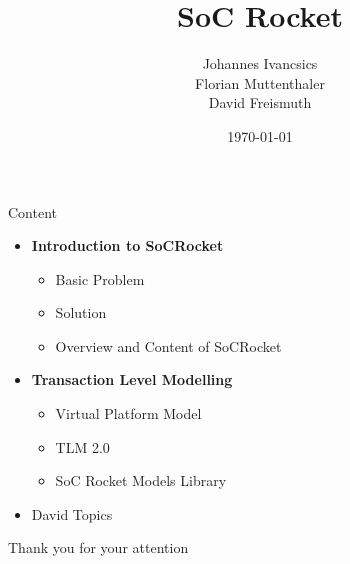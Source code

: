 \documentclass{beamer}
\title[SoC Rocket]{SoC Rocket}
\author{Johannes Ivancsics\\Florian Muttenthaler\\David Freismuth}
\institute[TU Wien]{TU Wien, Vienna, Austria}
\date{\today}
\begin{document}
\begin{frame}
  \titlepage
\end{frame}      


%
%

\begin{frame}{Content}
\begin{itemize}
\item \textbf{Introduction to SoCRocket}
\begin{itemize}
\item Basic Problem
\item Solution
\item Overview and Content of SoCRocket
\end{itemize}
\item \textbf{Transaction Level Modelling}
\begin{itemize}
\item Virtual Platform Model
\item TLM 2.0
\item SoC Rocket Models Library
\end{itemize}
\item David Topics
\end{itemize}

\end{frame}





\begin{frame}{}
  \centering\Huge
  Thank you for your attention
\end{frame}

%
%

%
\end{document}
